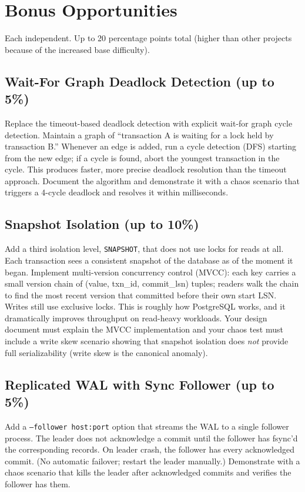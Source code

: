 \documentclass[11pt,a4paper]{article}
\begin{document}
\section{Bonus Opportunities}

Each independent. Up to 20 percentage points total (higher than other projects because of the increased base difficulty).

\subsection{Wait-For Graph Deadlock Detection (up to 5\%)}
Replace the timeout-based deadlock detection with explicit wait-for graph cycle detection. Maintain a graph of ``transaction A is waiting for a lock held by transaction B.'' Whenever an edge is added, run a cycle detection (DFS) starting from the new edge; if a cycle is found, abort the youngest transaction in the cycle. This produces faster, more precise deadlock resolution than the timeout approach. Document the algorithm and demonstrate it with a chaos scenario that triggers a 4-cycle deadlock and resolves it within milliseconds.

\subsection{Snapshot Isolation (up to 10\%)}
Add a third isolation level, \texttt{SNAPSHOT}, that does not use locks for reads at all. Each transaction sees a consistent snapshot of the database as of the moment it began. Implement multi-version concurrency control (MVCC): each key carries a small version chain of (value, txn\_id, commit\_lsn) tuples; readers walk the chain to find the most recent version that committed before their own start LSN. Writes still use exclusive locks. This is roughly how PostgreSQL works, and it dramatically improves throughput on read-heavy workloads. Your design document must explain the MVCC implementation and your chaos test must include a write skew scenario showing that snapshot isolation does \textit{not} provide full serializability (write skew is the canonical anomaly).

\subsection{Replicated WAL with Sync Follower (up to 5\%)}
Add a \texttt{--follower host:port} option that streams the WAL to a single follower process. The leader does not acknowledge a commit until the follower has fsync'd the corresponding records. On leader crash, the follower has every acknowledged commit. (No automatic failover; restart the leader manually.) Demonstrate with a chaos scenario that kills the leader after acknowledged commits and verifies the follower has them.
\end{document}
